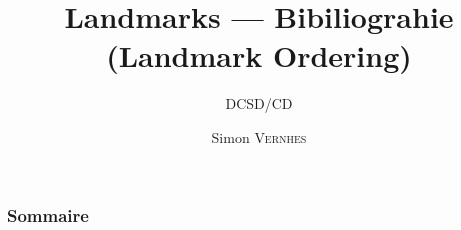 \documentclass{beamer}
\title{Landmarks — Bibiliograhie (Landmark Ordering)}
\subtitle{\footnotesize DCSD/CD}
\author{{\Large Simon \textsc{Vernhes}}}
\institute{\textsc{{\large Onera}}}
\date{\oldstylenums{\today}}
\begin{document}
	\begin{frame}
		\titlepage
	\end{frame}

	\begin{frame}
		\frametitle{Sommaire}
		\small \tableofcontents
	\end{frame}

  
  
  
  
\end{document}
